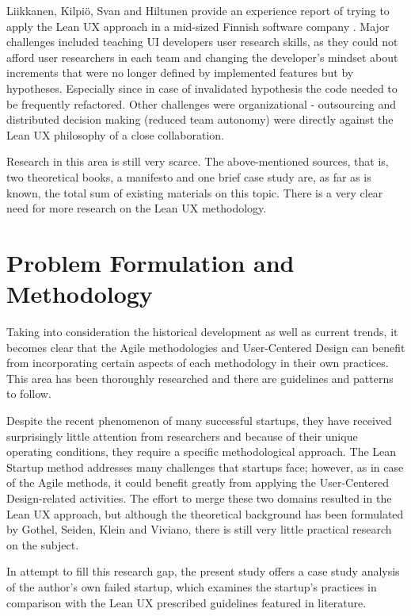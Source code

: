 \documentclass{article}
\begin{document}
Liikkanen, Kilpiö, Svan and Hiltunen provide an experience report of trying to apply the Lean UX approach in a mid-sized Finnish software company \citep{liikkanen2014lean}. Major challenges included teaching UI developers user research skills, as they could not afford user researchers in each team and changing the developer's mindset about increments that were no longer defined by implemented features but by hypotheses. Especially since in case of invalidated hypothesis the code needed to be frequently refactored. Other challenges were organizational - outsourcing and distributed decision making (reduced team autonomy) were directly against the Lean UX philosophy of a close collaboration.

Research in this area is still very scarce. The above-mentioned sources, that is, two theoretical books, a manifesto and one brief case study are, as far as is known, the total sum of existing materials on this topic. There is a very clear need for more research on the Lean UX methodology.

\section{Problem Formulation and Methodology}
\label{sec:probl-form-meth}
Taking into consideration the historical development as well as current trends, it becomes clear that the Agile methodologies and User-Centered Design can benefit from incorporating certain aspects of each methodology in their own practices. This area has been thoroughly researched and there are guidelines and patterns to follow.

Despite the recent phenomenon of many successful startups, they have received surprisingly little attention from researchers and because of their unique operating conditions, they require a specific methodological approach. The Lean Startup method addresses many challenges that startups face; however, as in case of the Agile methods, it could benefit greatly from applying the User-Centered Design-related activities. The effort to merge these two domains resulted in the Lean UX approach, but although the theoretical background has been formulated by Gothel, Seiden, Klein and Viviano, there is still very little practical research on the subject.

In attempt to fill this research gap, the present study offers a case study analysis of the author's own failed startup, which examines the startup's practices in comparison with the Lean UX prescribed guidelines featured in literature.
\end{document}
